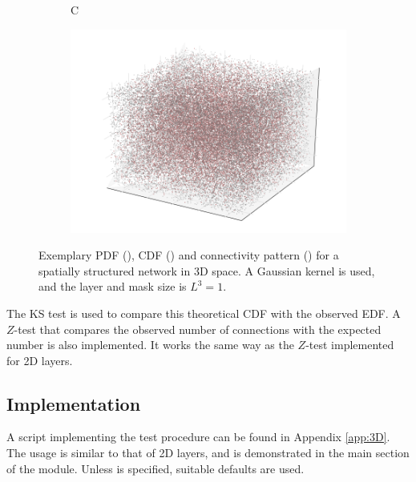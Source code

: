 \begin{figure}[ht]
\begin{subfigure}[b]{0.49\textwidth}
\end{subfigure}
\begin{subfigure}[b]{0.60\textwidth}
	  \begin{flushleft}
	  \large C
		\end{flushleft}
    \centering
    \includegraphics[width=\textwidth]{Gaussian3D_network.png}
    \label{subfig:gaussian3D_network}
\end{subfigure}
\caption[Exemplary PDF, CDF and connectivity pattern for a network in 3D space, using a Gaussian kernel]{Exemplary PDF (), CDF () and connectivity pattern () for a spatially structured network in 3D space. A Gaussian kernel is used, and the layer and mask size is $L^3 = 1$.}
\label{fig:3Dex}
\end{figure}

The KS test is used to compare this theoretical CDF with the observed EDF. A $Z$-test that compares the observed number of connections with the expected number is also implemented. It works the same way as the $Z$-test implemented for 2D layers.



\subsection{Implementation\label{subsec:3Dimp}}

A script implementing the test procedure can be found in Appendix \ref{app:3D}. The usage is similar to that of 2D layers, and is demonstrated in the main section of the module. Unless  is specified, suitable defaults are used.  



